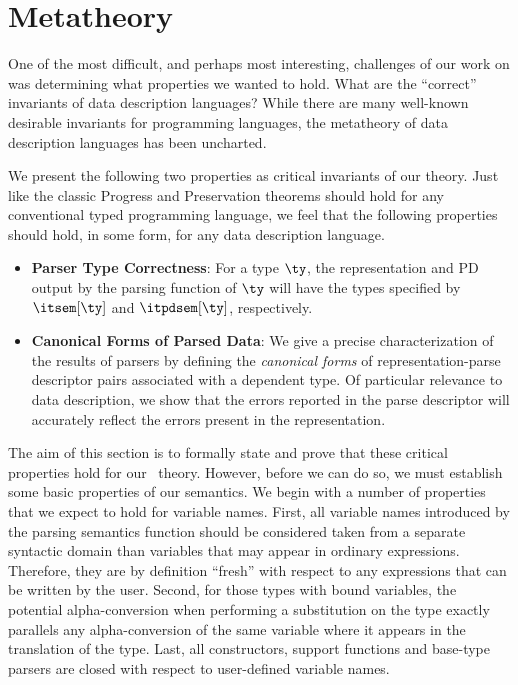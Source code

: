 \section{Metatheory}
\label{sec:ddc-meta-theory}

One of the most difficult, and perhaps most interesting, challenges of our
work on \ddc{} was determining what
properties we wanted to hold. What are the ``correct''
invariants of data description languages? While there are many
well-known desirable invariants for programming languages, the
metatheory of data description languages has been
uncharted.

We present the following two properties as critical invariants of
our theory.  Just like the classic Progress and Preservation theorems
should hold for any conventional typed programming language,
we feel that the following properties should hold, in some form, for any data
description language.
\begin{itemize}
\item {\bf Parser Type Correctness}: For a \ddc{} type $\ty$, the
  representation and PD output by the parsing function of $\ty$ will
  have the types specified by $\itsem[\ty]$ and
  $\itpdsem[\ty]$, respectively.
  
\item {\bf Canonical Forms of Parsed Data}: We give a precise
  characterization of the results of parsers by defining the {\em
    canonical forms} of representation-parse descriptor pairs
  associated with a dependent \ddc{} type. Of particular relevance to
  data description, we show that the errors reported in the parse
  descriptor will accurately reflect the errors present in the
  representation.
\end{itemize}

The aim of this section is to formally state and prove that these
critical properties hold for our \ddc\ theory. However, before we can
do so, we must establish some basic properties of our semantics. We
begin with a number of properties that we expect to hold for variable
names. First, all variable names introduced by the parsing semantics
function should be considered taken from a separate syntactic domain
than variables that may appear in ordinary expressions.  Therefore,
they are by definition ``fresh'' with respect to any expressions that
can be written by the user.  Second, for those types with bound
variables, the potential alpha-conversion when performing a
substitution on the type exactly parallels any alpha-conversion of the
same variable where it appears in the translation of the type. Last,
all constructors, support functions and base-type parsers are closed
with respect to user-defined variable names.

